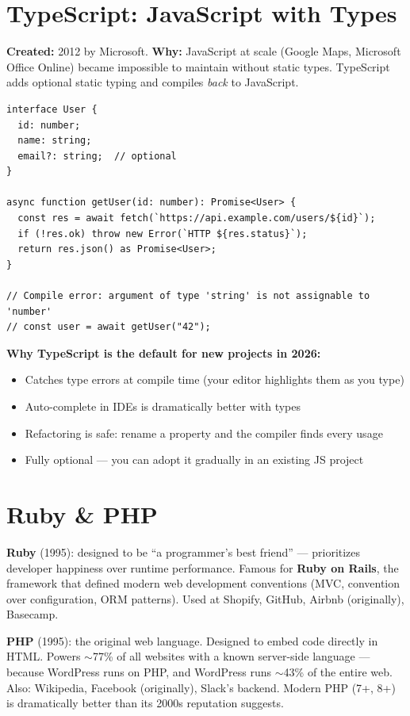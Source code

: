 \documentclass[11pt, letterpaper]{article}
\begin{document}
\section*{TypeScript: JavaScript with Types}

\textbf{Created:} 2012 by Microsoft. \textbf{Why:} JavaScript at scale (Google Maps, Microsoft Office Online) became impossible to maintain without static types. TypeScript adds optional static typing and compiles \emph{back} to JavaScript.

\begin{lstlisting}[style=code, caption={TypeScript: same code with types}]
interface User {
  id: number;
  name: string;
  email?: string;  // optional
}

async function getUser(id: number): Promise<User> {
  const res = await fetch(`https://api.example.com/users/${id}`);
  if (!res.ok) throw new Error(`HTTP ${res.status}`);
  return res.json() as Promise<User>;
}

// Compile error: argument of type 'string' is not assignable to 'number'
// const user = await getUser("42");
\end{lstlisting}

\textbf{Why TypeScript is the default for new projects in 2026:}
\begin{itemize}[noitemsep]
  \item Catches type errors at compile time (your editor highlights them as you type)
  \item Auto-complete in IDEs is dramatically better with types
  \item Refactoring is safe: rename a property and the compiler finds every usage
  \item Fully optional --- you can adopt it gradually in an existing JS project
\end{itemize}

\section*{Ruby \& PHP}

\textbf{Ruby} (1995): designed to be ``a programmer's best friend'' --- prioritizes developer happiness over runtime performance. Famous for \textbf{Ruby on Rails}, the framework that defined modern web development conventions (MVC, convention over configuration, ORM patterns). Used at Shopify, GitHub, Airbnb (originally), Basecamp.

\textbf{PHP} (1995): the original web language. Designed to embed code directly in HTML. Powers $\sim$77\% of all websites with a known server-side language --- because WordPress runs on PHP, and WordPress runs $\sim$43\% of the entire web. Also: Wikipedia, Facebook (originally), Slack's backend. Modern PHP (7+, 8+) is dramatically better than its 2000s reputation suggests.
\end{document}
